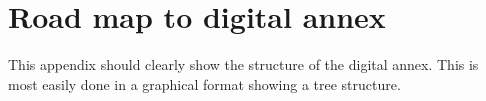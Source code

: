 \chapter{Road map to digital annex}
This appendix should clearly show the structure of the digital annex. This is most easily done in a graphical format showing a tree structure.